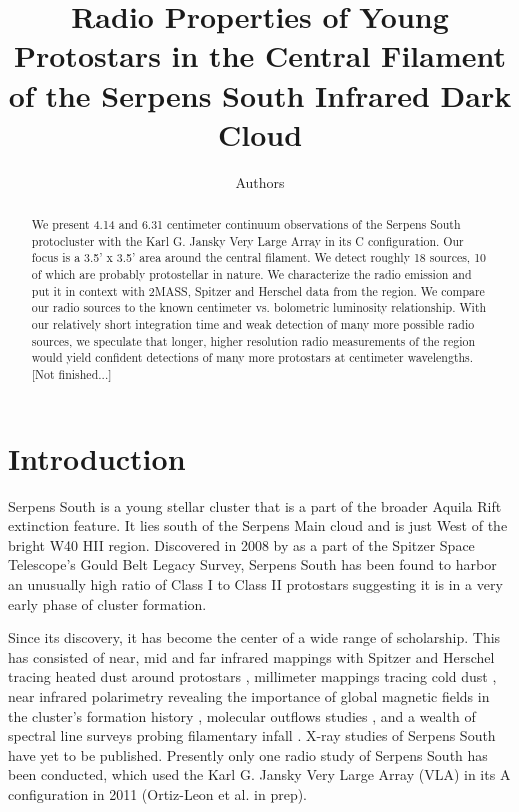 \documentclass[apj]{emulateapj}
\begin{document}
\title{Radio Properties of Young Protostars in the Central Filament of the Serpens South Infrared Dark Cloud}
\author{Authors}

\begin{abstract}

We present 4.14 and 6.31 centimeter continuum observations of the Serpens South protocluster with the Karl G. Jansky Very Large Array in its C configuration. Our focus is a 3.5' x 3.5' area around the central filament. We detect roughly 18 sources, 10 of which are probably protostellar in nature. We characterize the radio emission and put it in context with 2MASS, Spitzer and Herschel data from the region. We compare our radio sources to the known centimeter vs. bolometric luminosity relationship. With our relatively short integration time and weak detection of many more possible radio sources, we speculate that longer, higher resolution radio measurements of the region would yield confident detections of many more protostars at centimeter wavelengths. [Not finished...]

\end{abstract}

\maketitle
\newpage


\section{Introduction}
\label{sec:introduction}

	Serpens South is a young stellar cluster that is a part of the broader Aquila Rift extinction feature. It lies south of the Serpens Main cloud and is just West of the bright W40 HII region. Discovered in 2008 by \citet{Gutermuth08} as a part of the Spitzer Space Telescope's Gould Belt Legacy Survey, Serpens South has been found to harbor an unusually high ratio of Class I to Class II protostars suggesting it is in a very early phase of cluster formation. 
	
	Since its discovery, it has become the center of a wide range of scholarship. This has consisted of near, mid and far infrared mappings with Spitzer and Herschel tracing heated dust around protostars \citep{Gutermuth08, Bontemps10}, millimeter mappings tracing cold dust \citep{Maury11}, near infrared polarimetry revealing the importance of global magnetic fields in the cluster's formation history \citep{Sugitani11}, molecular outflows studies \citep{Nakamura11, Teixeira12}, and a wealth of spectral line surveys probing filamentary infall \citep{Kirk13, Friesen13, Tanaka13, FernandezLopez14, Nakamura14a}. X-ray studies of Serpens South have yet to be published. Presently only one radio study of Serpens South has been conducted, which used the Karl G. Jansky Very Large Array (VLA) in its A configuration in 2011 (Ortiz-Leon et al. in prep). 
	
\end{document}
